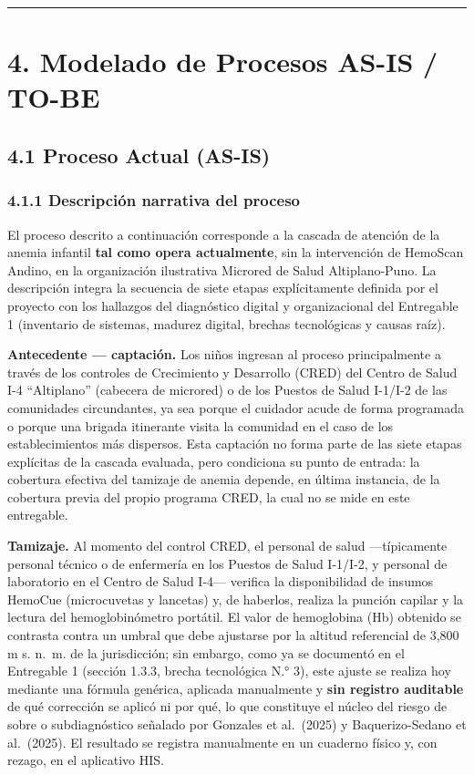\documentclass[11pt,a4paper]{article}
\begin{document}
\begin{center}\rule{0.5\linewidth}{0.5pt}\end{center}

\section{4. Modelado de Procesos AS-IS / TO-BE}\label{modelado-de-procesos-as-is-to-be}

\subsection{4.1 Proceso Actual (AS-IS)}\label{proceso-actual-as-is}

\subsubsection{4.1.1 Descripción narrativa del proceso}\label{descripciuxf3n-narrativa-del-proceso}

El proceso descrito a continuación corresponde a la cascada de atención de la anemia infantil \textbf{tal como opera actualmente}, sin la intervención de HemoScan Andino, en la organización ilustrativa Microred de Salud Altiplano-Puno. La descripción integra la secuencia de siete etapas explícitamente definida por el proyecto con los hallazgos del diagnóstico digital y organizacional del Entregable 1 (inventario de sistemas, madurez digital, brechas tecnológicas y causas raíz).

\textbf{Antecedente --- captación.} Los niños ingresan al proceso principalmente a través de los controles de Crecimiento y Desarrollo (CRED) del Centro de Salud I-4 ``Altiplano'' (cabecera de microred) o de los Puestos de Salud I-1/I-2 de las comunidades circundantes, ya sea porque el cuidador acude de forma programada o porque una brigada itinerante visita la comunidad en el caso de los establecimientos más dispersos. Esta captación no forma parte de las siete etapas explícitas de la cascada evaluada, pero condiciona su punto de entrada: la cobertura efectiva del tamizaje de anemia depende, en última instancia, de la cobertura previa del propio programa CRED, la cual no se mide en este entregable.

\textbf{Tamizaje.} Al momento del control CRED, el personal de salud ---típicamente personal técnico o de enfermería en los Puestos de Salud I-1/I-2, y personal de laboratorio en el Centro de Salud I-4--- verifica la disponibilidad de insumos HemoCue (microcuvetas y lancetas) y, de haberlos, realiza la punción capilar y la lectura del hemoglobinómetro portátil. El valor de hemoglobina (Hb) obtenido se contrasta contra un umbral que debe ajustarse por la altitud referencial de 3,800 m s. n.~m. de la jurisdicción; sin embargo, como ya se documentó en el Entregable 1 (sección 1.3.3, brecha tecnológica N.° 3), este ajuste se realiza hoy mediante una fórmula genérica, aplicada manualmente y \textbf{sin registro auditable} de qué corrección se aplicó ni por qué, lo que constituye el núcleo del riesgo de sobre o subdiagnóstico señalado por Gonzales et al.~(2025) y Baquerizo-Sedano et al.~(2025). El resultado se registra manualmente en un cuaderno físico y, con rezago, en el aplicativo HIS.
\end{document}

